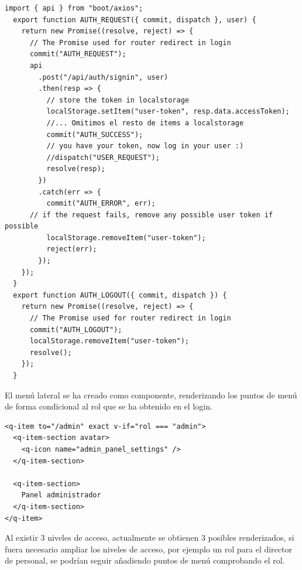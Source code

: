 \documentclass[11pt,spanish,listoffigures,listoftables]{tfgetsinf}
\begin{document}
\begin{lstlisting}[style=ES6, caption={Dispatch de una acción Vuex en el login}]
  import { api } from "boot/axios";
  export function AUTH_REQUEST({ commit, dispatch }, user) {
    return new Promise((resolve, reject) => {
      // The Promise used for router redirect in login
      commit("AUTH_REQUEST");
      api
        .post("/api/auth/signin", user)
        .then(resp => {
          // store the token in localstorage
          localStorage.setItem("user-token", resp.data.accessToken); 
          //... Omitimos el resto de items a localstorage
          commit("AUTH_SUCCESS");
          // you have your token, now log in your user :)
          //dispatch("USER_REQUEST");
          resolve(resp);
        })
        .catch(err => {
          commit("AUTH_ERROR", err);
      // if the request fails, remove any possible user token if possible
          localStorage.removeItem("user-token"); 
          reject(err);
        });
    });
  }  
  export function AUTH_LOGOUT({ commit, dispatch }) {
    return new Promise((resolve, reject) => {
      // The Promise used for router redirect in login
      commit("AUTH_LOGOUT");
      localStorage.removeItem("user-token");
      resolve();
    });
  }
\end{lstlisting}

El menú lateral se ha creado como componente, renderizando los puntos de menú de forma condicional al rol que se ha obtenido en el login.

\begin{lstlisting}[style=ES6, caption={Renderización condicional de punto de menú Admin}]
  <q-item to="/admin" exact v-if="rol === "admin">
  <q-item-section avatar>
    <q-icon name="admin_panel_settings" />
  </q-item-section>

  <q-item-section>
    Panel administrador
  </q-item-section>
</q-item>
\end{lstlisting}

Al existir 3 niveles de acceso, actualmente se obtienen 3 posibles renderizados, si fuera necesario ampliar los niveles de acceso, por ejemplo un rol para el director de personal, se podrían seguir añadiendo puntos de menú comprobando el rol.
\end{document}
